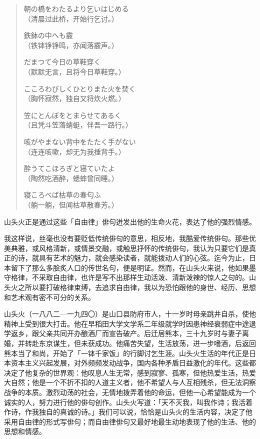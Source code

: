 {\begin{quote}
        {\FM 朝の橋をわたるより乞いはじめる}\\
        （清晨过此桥，开始行乞讨。）

        {\FM 鉄鉢の中へも霰}\\
        （铁钵铮铮鸣，亦闻落霰声。）

        {\FM だまつて今日の草鞋穿く}\\
        （默默无言，且将今日草鞋穿。）

        {\FM こころわびしくひとりまた火を焚く}\\
        （胸怀寂然，独自又将炊火燃。）

        {\FM 笠にとんぼをとまらせてあるく}\\
        （且凭斗笠落蜻蜓，伴吾一路行。）

        {\FM 咳がやまない背中をたたく手がない}\\
        （连连咳嗽，却无为我捶背手。）

        {\FM 酔うてこほろぎと寝ていたよ}\\
        （陶然吃酒醉，蟋蟀曾同睡。）

        {\FM 寝ころべば枯草の春匂ふ}\\
        （躺一躺，但闻枯草散春芳。）
    \end{quote}

    山头火正是通过这些「自由律」俳句迸发出他的生命火花，表达了他的强烈情感。

    我这样说，丝毫也没有要贬低传统俳句的意思，相反地，我酷爱传统俳句。那些优美典雅，或风格清新，或情景交融，或触思抒怀的传统俳句，我认为只要它们是真正的诗，就具有艺术的魅力，就会感染读者，就能拨动人们的心弦。迄今为止，日本留下了那么多脍炙人口的传世名句，便是明证。然而，在山头火来说，他如果墨守格律，不采取自由律，也许是写不出那样生动活泼、清新泼辣的惊人之句的。山头火之所以要打破格律束缚，去追求自由律，我以为恐怕跟他的身世、经历、思想和艺术观有密不可分的关系。

    山头火（一八八二—一九四〇）是山口县防府市人，十一岁时母亲跳井自杀，使他精神上受到很大打击。他在早稻田大学文学系二年级就学时因患神经衰弱症中途退学返乡，跟父亲共同开办酿酒厂而宣告破产。后迁居熊本，三十九岁时与妻子离婚，并转赴东京谋生，但未获成功。他痛苦失望，生活放荡，进一步嗜酒，后返回熊本当了和尚，开始了「一钵千家饭」的行脚讨乞生涯。山头火生活的年代正是日本资本主义兴起发展，对外频频发动战争，国内各种矛盾日益激化的年代。这些都决定了他复杂的世界观：他叹息人生无常，感到寂寥、孤寒，但他热爱生活，热爱大自然；他是一个不折不扣的人道主义者，他不希望人与人互相残杀，但无法洞察战争的本质。激烈动荡的社会，无情地拨弄着他的命运，但他一心希望能成为一个诚实的人，努力进行他的俳句创作。山头火写道：「天不灭我，叫我作诗；我活着作诗，作我独自的真诚的诗。」我们可以说，恰恰是山头火的生活内容，决定了他采用自由律的形式写俳句；而自由律俳句又最好地最生动地表现了他的生活、他的思想和情感。

}
